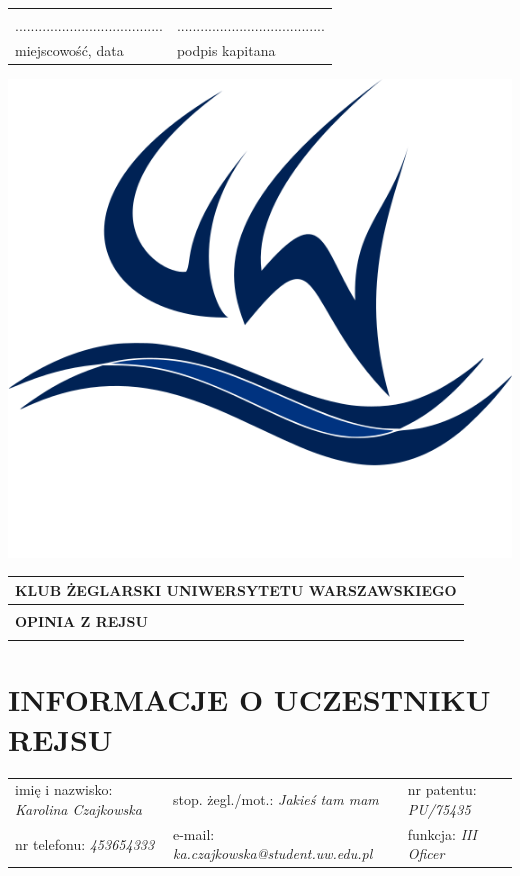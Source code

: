 \documentclass{article}
\begin{document}
\begin{tabularx}{\textwidth}{X X}
\\\\
...................................... & ......................................\\
miejscowość, data & podpis kapitana\\
\end{tabularx}
\newpage
\begin{minipage}{0.11\textwidth}
\includegraphics[width=\textwidth]{logo.png}
\end{minipage}
\begin{minipage}{0.89\textwidth}
\begin{tabularx}{\textwidth} { 
  | >{\centering\arraybackslash}X | }
 \hline
 \textbf{KLUB ŻEGLARSKI UNIWERSYTETU WARSZAWSKIEGO} \\
 \hline
 \\
 \textbf{\huge OPINIA Z REJSU} \\
 \\
\hline
\end{tabularx}
\end{minipage}

\section*{INFORMACJE O UCZESTNIKU REJSU}
\begin{tabularx}{\textwidth}{X X X}
imię i nazwisko: \textit{Karolina Czajkowska} & stop. żegl./mot.: \textit{Jakieś tam mam} & nr patentu: \textit{PU/75435} \\
nr telefonu: \textit{453654333} & e-mail: \textit{ka.czajkowska@student.uw.edu.pl} & funkcja: \textit{III Oficer} \\
\end{tabularx}
\end{document}
